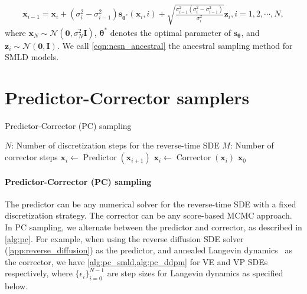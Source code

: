 \documentclass{article} \usepackage{iclr2021_conference,times}
\newcommand{\mcal}{\mathcal}
\newcommand{\bfx}{\mathbf{x}}
\newcommand{\bfz}{\mathbf{z}}
\newcommand{\bfI}{\mathbf{I}}
\newcommand{\bfzero}{\mathbf{0}}
\newcommand{\bftheta}{{\boldsymbol{\theta}}}
\newcommand{\bfs}{\mathbf{s}}
\begin{document}
\begin{align}
    \bfx_{i-1} = \bfx_i + (\sigma_i^2 - \sigma_{i-1}^2) \bfs_{\bftheta^*}(\bfx_i, i) + \sqrt{\frac{\sigma_{i-1}^2 (\sigma_i^2 - \sigma_{i-1}^2)}{\sigma_i^2}} \bfz_i, i=1,2,\cdots, N, \label{eqn:ncsn_ancestral}
\end{align}
where $\bfx_N \sim \mcal{N}(\bfzero, \sigma_N^2 \bfI)$, $\bftheta^*$ denotes the optimal parameter of $\bfs_\bftheta$, and $\bfz_i \sim \mcal{N}(\bfzero, \bfI)$. We call \cref{eqn:ncsn_ancestral} the ancestral sampling method for SMLD models.


\section{Predictor-Corrector samplers}\label{app:pc}

\begin{algorithm}[!t]
   \caption{Predictor-Corrector (PC) sampling}
   \label{alg:pc}
    \begin{algorithmic}[1]
        \Require    
            \Statex $N$: Number of discretization steps for the reverse-time SDE
            \Statex $M$: Number of corrector steps
       \State{Initialize $\bfx_N \sim p_T(\bfx)$}
        \State $\bfx_i \gets \operatorname{Predictor}(\bfx_{i+1})$
            \State $\bfx_i \gets \operatorname{Corrector}(\bfx_i)$
         \EndFor
       \EndFor
        $\bfx_0$
    \end{algorithmic}
    \end{algorithm}

\paragraph{Predictor-Corrector (PC) sampling} 
The predictor can be any numerical solver for the reverse-time SDE with a fixed discretization strategy. The corrector can be any score-based MCMC approach. In PC sampling, we alternate between the predictor and corrector, as described in \cref{alg:pc}. For example, when using the reverse diffusion SDE solver (\cref{app:reverse_diffusion}) as the predictor, and annealed Langevin dynamics~\citep{song2019generative} as the corrector, we have \cref{alg:pc_smld,alg:pc_ddpm} for VE and VP SDEs respectively, where $\{\epsilon_i\}_{i=0}^{N-1}$ are step sizes for Langevin dynamics as specified below.
\end{document}
